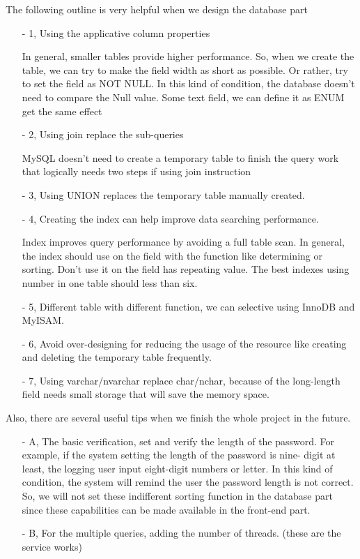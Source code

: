 \documentclass[draftclsnofoot, onecolumn, letterpaper, 10pt]{IEEEtran}
\begin{document}
The following outline is very helpful when we design the database part
\begin{itemize}
\item[-] 1, Using the applicative column properties

In general, smaller tables provide higher performance. So, when we create the table, we can try to make the field width as short as possible. Or rather, try to set the field as NOT NULL. In this kind of condition, the database doesn't need to compare the Null value. Some text field, we can define it as ENUM get the same effect
\item[-] 2, Using join replace the sub-queries

MySQL doesn't need to create a temporary table to finish the query work that logically needs two steps if using join instruction
\item[-] 3, Using UNION replaces the temporary table manually created.
\item[-] 4, Creating the index can help improve data searching performance. 

Index improves query performance by avoiding a full table scan. In general, the index should use on the field with the function like determining or sorting. Don't use it on the field has repeating value. The best indexes using number in one table should less than six.
\item[-] 5, Different table with different function, we can selective using InnoDB and MyISAM.
\item[-] 6, Avoid over-designing for reducing the usage of the resource like creating and deleting the temporary table frequently.
\item[-] 7, Using varchar/nvarchar replace char/nchar, because of the long-length field needs small storage that will save the memory space.
 \end{itemize}
Also, there are several useful tips when we finish the whole project in the future. 	
\begin{itemize}
\item[-] A, The basic verification, set and verify the length of the password. For example, if the system setting the length of the password is nine- digit at least, the logging user input eight-digit numbers or letter. In this kind of condition, the system will remind the user the password length is not correct. So, we will not set these indifferent sorting function in the database part since these capabilities can be made available in the front-end part.
\item[-] B, For the multiple queries, adding the number of threads. (these are the service works)	
\end{itemize}
\end{document}
